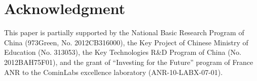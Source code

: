 \documentclass[conference]{IEEEtran}
\begin{document}
\section*{Acknowledgment}
This paper is partially supported by the National Basic Research Program of China (973Green, No. 2012CB316000), the Key Project of Chinese Ministry of Education (No. 313053), the Key Technologies R\&D Program of China (No. 2012BAH75F01), and the grant of ``Investing for the Future'' program of France ANR to the CominLabs excellence laboratory (ANR-10-LABX-07-01).


\end{document}
